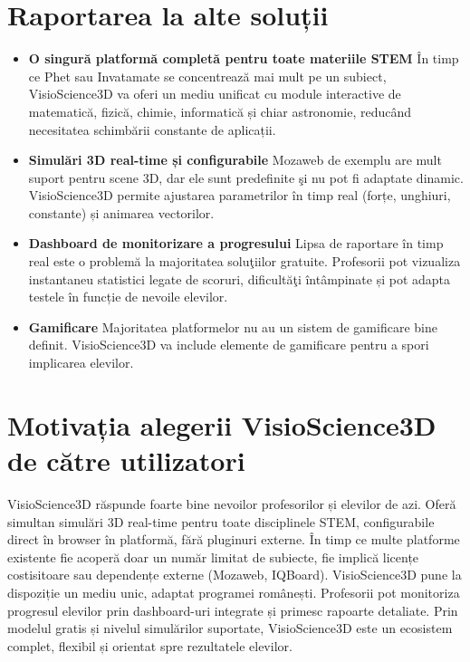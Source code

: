 \section{Raportarea la alte soluții}
\label{sub-sec:proj-scope}


\begin{itemize}
    \item \textbf{O singură platformă completă pentru toate materiile STEM}
    În timp ce Phet sau Invatamate se concentrează mai mult pe un subiect, VisioScience3D
    va oferi un mediu unificat cu module interactive de matematică, fizică, chimie, informatică și
    chiar astronomie, reducând necesitatea schimbării constante de aplicații.
    \item \textbf{Simulări 3D real-time și configurabile}
    Mozaweb de exemplu are mult suport pentru scene 3D, dar ele sunt predefinite şi nu pot fi adaptate dinamic. 
    VisioScience3D permite ajustarea parametrilor în timp real (forțe, unghiuri, constante) și animarea vectorilor.
    \item \textbf{Dashboard de monitorizare a progresului}
    Lipsa de raportare în timp real este o problemă la majoritatea soluţiilor gratuite. 
    Profesorii pot vizualiza instantaneu statistici legate de scoruri, dificultăţi întâmpinate și 
    pot adapta testele în funcție de nevoile elevilor.
    \item \textbf{Gamificare}
    Majoritatea platformelor nu au un sistem de gamificare bine definit. VisioScience3D va include elemente
    de gamificare pentru a spori implicarea elevilor.
\end{itemize}

\section{Motivația alegerii VisioScience3D de către utilizatori}
\label{sub-sec:proj-motivatie}

VisioScience3D răspunde foarte bine nevoilor profesorilor și elevilor de azi.
Oferă simultan simulări 3D real-time pentru toate disciplinele STEM, configurabile 
direct în browser în platformă, fără pluginuri externe. În timp ce multe platforme 
existente fie acoperă doar un număr limitat de subiecte, fie implică licențe costisitoare
sau dependențe externe (Mozaweb, IQBoard). VisioScience3D pune la dispoziție un mediu unic,
adaptat programei românești. Profesorii pot monitoriza progresul elevilor prin dashboard-uri
integrate și primesc rapoarte detaliate. Prin modelul gratis și nivelul simulărilor suportate,
VisioScience3D este un ecosistem complet, flexibil și orientat spre rezultatele elevilor.